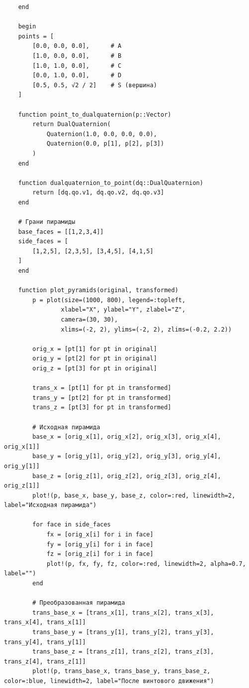 \begin{verbatim}
    end

    begin
    points = [
        [0.0, 0.0, 0.0],      # A
        [1.0, 0.0, 0.0],      # B
        [1.0, 1.0, 0.0],      # C
        [0.0, 1.0, 0.0],      # D
        [0.5, 0.5, √2 / 2]    # S (вершина)
    ]

    function point_to_dualquaternion(p::Vector)
        return DualQuaternion(
            Quaternion(1.0, 0.0, 0.0, 0.0),
            Quaternion(0.0, p[1], p[2], p[3])
        )
    end

    function dualquaternion_to_point(dq::DualQuaternion)
        return [dq.qo.v1, dq.qo.v2, dq.qo.v3]
    end

    # Грани пирамиды
    base_faces = [[1,2,3,4]]
    side_faces = [
        [1,2,5], [2,3,5], [3,4,5], [4,1,5]
    ]
    end

    function plot_pyramids(original, transformed)
        p = plot(size=(1000, 800), legend=:topleft,
                xlabel="X", ylabel="Y", zlabel="Z",
                camera=(30, 30),
                xlims=(-2, 2), ylims=(-2, 2), zlims=(-0.2, 2.2))

        orig_x = [pt[1] for pt in original]
        orig_y = [pt[2] for pt in original]
        orig_z = [pt[3] for pt in original]

        trans_x = [pt[1] for pt in transformed]
        trans_y = [pt[2] for pt in transformed]
        trans_z = [pt[3] for pt in transformed]

        # Исходная пирамида
        base_x = [orig_x[1], orig_x[2], orig_x[3], orig_x[4], orig_x[1]]
        base_y = [orig_y[1], orig_y[2], orig_y[3], orig_y[4], orig_y[1]]
        base_z = [orig_z[1], orig_z[2], orig_z[3], orig_z[4], orig_z[1]]
        plot!(p, base_x, base_y, base_z, color=:red, linewidth=2, label="Исходная пирамида")

        for face in side_faces
            fx = [orig_x[i] for i in face]
            fy = [orig_y[i] for i in face]
            fz = [orig_z[i] for i in face]
            plot!(p, fx, fy, fz, color=:red, linewidth=2, alpha=0.7, label="")
        end

        # Преобразованная пирамида
        trans_base_x = [trans_x[1], trans_x[2], trans_x[3], trans_x[4], trans_x[1]]
        trans_base_y = [trans_y[1], trans_y[2], trans_y[3], trans_y[4], trans_y[1]]
        trans_base_z = [trans_z[1], trans_z[2], trans_z[3], trans_z[4], trans_z[1]]
        plot!(p, trans_base_x, trans_base_y, trans_base_z, color=:blue, linewidth=2, label="После винтового движения")


\end{verbatim}
